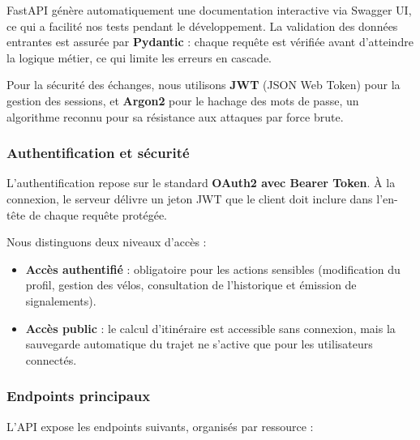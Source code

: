 FastAPI génère automatiquement une documentation interactive via Swagger UI, ce qui a facilité nos tests pendant le développement. La validation des données entrantes est assurée par \textbf{Pydantic} : chaque requête est vérifiée avant d'atteindre la logique métier, ce qui limite les erreurs en cascade.

Pour la sécurité des échanges, nous utilisons \textbf{JWT} (JSON Web Token) pour la gestion des sessions, et \textbf{Argon2} pour le hachage des mots de passe, un algorithme reconnu pour sa résistance aux attaques par force brute.

\subsubsection{Authentification et sécurité}

L'authentification repose sur le standard \textbf{OAuth2 avec Bearer Token}. À la connexion, le serveur délivre un jeton JWT que le client doit inclure dans l'en-tête de chaque requête protégée.

Nous distinguons deux niveaux d'accès :
\begin{itemize}
    \item \textbf{Accès authentifié} : obligatoire pour les actions sensibles (modification du profil, gestion des vélos, consultation de l'historique et émission de signalements).
    \item \textbf{Accès public} : le calcul d'itinéraire est accessible sans connexion, mais la sauvegarde automatique du trajet ne s'active que pour les utilisateurs connectés.
\end{itemize}

\subsubsection{Endpoints principaux}

L'API expose les endpoints suivants, organisés par ressource :

